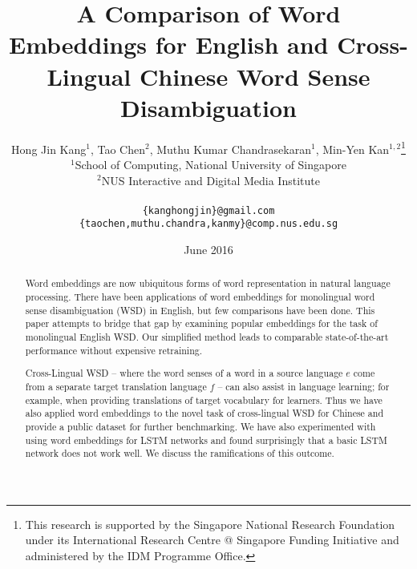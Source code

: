 \documentclass[11pt]{article}
\title{A Comparison of Word Embeddings for English and Cross-Lingual Chinese Word Sense Disambiguation}
\author{
Hong Jin Kang$^{1}$, Tao Chen$^{2}$,  Muthu Kumar Chandrasekaran$^{1}$, Min-Yen Kan$^{1,2}$\thanks{ This research is supported by the Singapore National Research Foundation
under its International Research Centre @ Singapore Funding
Initiative and administered by the IDM Programme Office.} \\
$^{1}$School of Computing, National University of Singapore\\
$^{2}$NUS Interactive and Digital Media Institute\\
\\
{\tt  \{kanghongjin\}@gmail.com} \\
{\tt  \{taochen,muthu.chandra,kanmy\}@comp.nus.edu.sg} \\
}
\date{June 2016}
\begin{document}
\maketitle
  

\begin{abstract}
Word embeddings are now ubiquitous forms of word representation in
natural language processing.  There have been applications of 
word embeddings for monolingual word sense disambiguation (WSD) in English,
but few comparisons have been done.  This paper attempts to bridge
that gap by examining popular embeddings for the task of monolingual
English WSD.  Our simplified method leads to comparable
state-of-the-art performance without expensive retraining.

Cross-Lingual WSD -- where the word senses of a word in a source
language $e$ come from a separate target translation language $f$ --
can also assist in language learning; for example, when providing
translations of target vocabulary for learners.  Thus we have also
applied word embeddings to the novel task of cross-lingual WSD for
Chinese and provide a public dataset for further benchmarking.
We have also experimented with using word embeddings for LSTM networks
and found surprisingly that a basic LSTM network does not work well.
We discuss the ramifications of this outcome.
\end{abstract}









\end{document}
